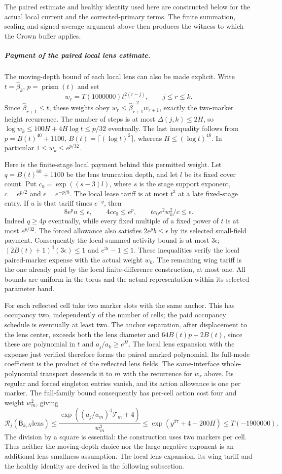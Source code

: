 The paired estimate and healthy identity used here are constructed
below for the actual local current and the corrected-primary terms.
The finite summation, scaling and signed-average argument above then
produces the witness to which the Crown buffer applies.

\subparagraph{Payment of the paired local lens estimate.}
The moving-depth bound of each local lens can also be made explicit.
Write $t=\widehat\beta_k$, $p=\operatorname{prism}(t)$ and set
\[
 w_r=T(1000000)t^{2(r-j)},\qquad j\le r\le k.
\]
Since $\widehat\beta_{r+1}\le t$, these weights obey
$w_r\le\widehat\beta_{r+1}^{-2}w_{r+1}$, exactly the two-marker
height recurrence. The number of steps is at most $\Delta(j,k)\le2H$,
so
$\log w_k\le100H+4H\log t\le p/32$ eventually. The last inequality
follows from $p=B(t)^{40}+1100$, $B(t)=\lceil(\log t)^2\rceil$,
whereas $H\le(\log t)^{48}$. In particular $1\le w_k\le e^{p/32}$.

Here is the finite-stage local payment behind this permitted weight.
Let $q=B(t)^{60}+1100$ be the lens truncation depth, and let $l$ be
its fixed cover count. Put
$c_0=\exp((s-3)l)$, where $s$ is the stage support exponent,
$c=e^{p/2}$ and $\epsilon=e^{-p/8}$. The local lease tariff is at
most $t^3$ at a late fixed-stage entry. If $u$ is that tariff times
$e^{-q}$, then
\[
 8e^p u\le\epsilon,\qquad
 4c c_0\le e^p,\qquad
 t c_0e^2w_k^2/c\le\epsilon.
\]
Indeed $q\ge4p$ eventually, while every fixed multiple of a fixed
power of $t$ is at most $e^{p/32}$. The forced allowance also satisfies
$2e^p b\le\epsilon$ by its selected small-field payment. Consequently
the local summed activity bound is at most $3\epsilon$;
$(2B(t)+1)^4(3\epsilon)\le1$ and $e^{3\epsilon}-1\le1$.
These inequalities verify the local paired-marker expense with the
actual weight $w_k$. The remaining wing tariff is the one already
paid by the local finite-difference construction, at most one.
All bounds are uniform in the torus and the actual representation
within its selected parameter band.

For each reflected cell take two marker slots with the same anchor.
This has occupancy two, independently of the number of cells; the
paid occupancy schedule is eventually at least two. The anchor
separation, after displacement to the lens center, exceeds both the
lens diameter and $64B(t)p+2B(t)$, since these are polynomial in $t$
and $a_j/a_k\ge e^H$. The local lens expansion with the expense just
verified therefore forms the paired marked polynomial. Its full-mode
coefficient is the product of the reflected lens fields. The same-interface
whole-polynomial transport descends it to $m$ with the recurrence for
$w_r$ above. Its regular and forced singleton entries vanish, and its
action allowance is one per marker. The full-family bound consequently
has per-cell action cost four and weight $w_m^2$, giving
\[
 \mathcal R_j(\mathsf B_{k,N}\mathrm{lens})
 \le\frac{\exp((a_j/a_m)^4\mathcal T_m+4)}{w_m^2}
 \le\exp(y^{27}+4-200H)
 \le T(-1900000).
\]
The division by a square is essential: the construction uses two
markers per cell. Thus neither the moving-depth choice nor the large
negative exponent is an additional lens smallness assumption. The local lens expansion, its wing tariff and the healthy identity
are derived in the following subsection.

